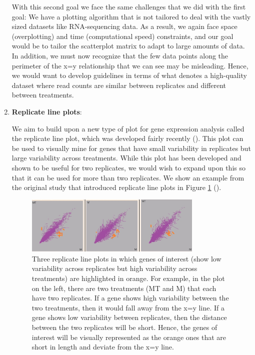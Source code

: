 \documentclass[11pt,a4paper,oldfontcommands,openany]{memoir}
\numberwithin{equation}{section} %
\begin{document}
\begin{enumerate}
With this second goal we face the same challenges that we did with the first goal: We have a plotting algorithm that is not tailored to deal with the vastly sized datasets like RNA-sequencing data. As a result, we again face space (overplotting) and time (computational speed) constraints, and our goal would be to tailor the scatterplot matrix to adapt to large amounts of data. In addition, we must now recognize that the few data points along the perimeter of the x=y relationship that we can see may be misleading. Hence, we would want to develop guidelines in terms of what denotes a high-quality dataset where read counts are similar between replicates and different between treatments. 

\item \textbf{Replicate line plots}:

We aim to build upon a new type of plot for gene expression analysis called the replicate line plot, which was developed fairly recently (\citealt{jds}). This plot can be used to visually mine for genes that have small variability in replicates but large variability across treatments. While this plot has been developed and shown to be useful for two replicates, we would wish to expand upon this so that it can be used for more than two replicates. We show an example from the original study that introduced replicate line plots in Figure \ref{fig:porcupine} (\citealt{jds}).

\begin{figure}[H]
\centering
    \begin{framed}
    \includegraphics[width=0.8\textwidth]{porcupine}
    \end{framed}
    \caption{Three replicate line plots in which genes of interest (show low variability across replicates but high variability across treatments) are highlighted in orange. For example, in the plot on the left, there are two treatments (MT and M) that each have two replicates. If a gene shows high variability between the two treatments, then it would fall away from the x=y line. If a gene shows low variability between replicates, then the distance between the two replicates will be short. Hence, the genes of interest will be visually represented as the orange ones that are short in length and deviate from the x=y line.}
    \label{fig:porcupine}
\end{figure}


\end{enumerate}
\end{document}
